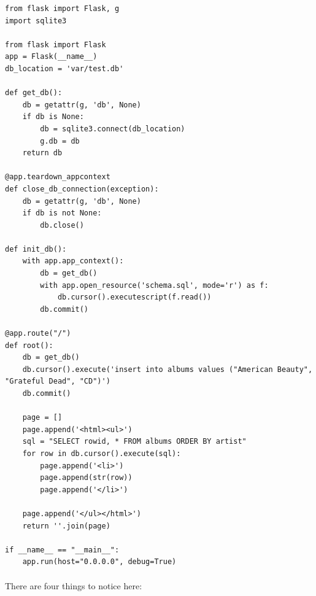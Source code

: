 \documentclass[12pt, a4paper, oneside]{book}
\begin{document}
\begin{lstlisting}
from flask import Flask, g
import sqlite3

from flask import Flask
app = Flask(__name__)
db_location = 'var/test.db'

def get_db():
    db = getattr(g, 'db', None)
    if db is None:
        db = sqlite3.connect(db_location)
        g.db = db
    return db

@app.teardown_appcontext
def close_db_connection(exception):
    db = getattr(g, 'db', None)
    if db is not None:
        db.close()

def init_db():
    with app.app_context():
        db = get_db() 
        with app.open_resource('schema.sql', mode='r') as f:
            db.cursor().executescript(f.read())
        db.commit()

@app.route("/")
def root():
    db = get_db()
    db.cursor().execute('insert into albums values ("American Beauty", "Grateful Dead", "CD")')
    db.commit()

    page = []
    page.append('<html><ul>')
    sql = "SELECT rowid, * FROM albums ORDER BY artist"
    for row in db.cursor().execute(sql):
        page.append('<li>')
        page.append(str(row))
        page.append('</li>')

    page.append('</ul></html>')
    return ''.join(page)

if __name__ == "__main__":
    app.run(host="0.0.0.0", debug=True)
\end{lstlisting}

\paragraph{} There are four things to notice here:
\end{document}
